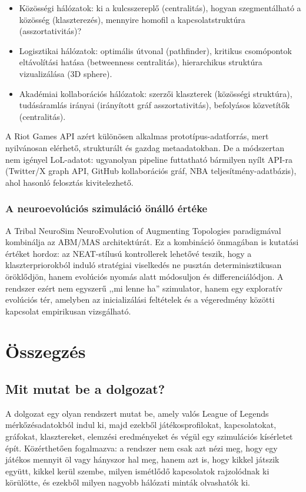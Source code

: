 ﻿\documentclass[a4paper,12pt]{report}
\begin{document}
\begin{itemize}
  \item Közösségi hálózatok: ki a kulcsszereplő (centralitás), hogyan szegmentálható
    a közösség (klaszterezés), mennyire homofil a kapcsolatstruktúra (asszortativitás)?
  \item Logisztikai hálózatok: optimális útvonal (pathfinder), kritikus csomópontok
    eltávolítási hatása (betweenness centralitás), hierarchikus struktúra vizualizálása
    (3D sphere).
  \item Akadémiai kollaborációs hálózatok: szerzői klaszterek (közösségi struktúra),
    tudásáramlás irányai (irányított gráf asszortativitás), befolyásos közvetítők
    (centralitás).
\end{itemize}

A Riot Games API azért különösen alkalmas prototípus-adatforrás, mert nyilvánosan
elérhető, strukturált és gazdag metaadatokban. De a módszertan nem igényel LoL-adatot:
ugyanolyan pipeline futtatható bármilyen nyílt API-ra (Twitter/X graph API, GitHub
kollaborációs gráf, NBA teljesítmény-adatbázis), ahol hasonló felosztás kivitelezhető.

\subsection*{A neuroevolúciós szimuláció önálló értéke}

A Tribal NeuroSim NeuroEvolution of Augmenting Topologies paradigmával kombinálja az
ABM/MAS architektúrát. Ez a kombináció önmagában is kutatási értéket hordoz:
az NEAT-stílusú kontrollerek lehetővé teszik, hogy a klaszterpriorokból induló
stratégiai viselkedés ne pusztán determinisztikusan öröklődjön, hanem evolúciós
nyomás alatt módosuljon és differenciálódjon. A rendszer ezért nem egyszerű
,,mi lenne ha'' szimulator, hanem egy exploratív evolúciós tér, amelyben az
inicializálási feltételek és a végeredmény közötti kapcsolat empirikusan vizsgálható.

\chapter{Összegzés}

\section{Mit mutat be a dolgozat?}

A dolgozat egy olyan rendszert mutat be, amely valós League of Legends mérkőzésadatokból indul ki,
majd ezekből játékosprofilokat, kapcsolatokat, gráfokat, klasztereket, elemzési eredményeket és
végül egy szimulációs kísérletet épít. Közérthetően fogalmazva: a rendszer nem csak azt nézi meg,
hogy egy játékos mennyit öl vagy hányszor hal meg, hanem azt is, hogy kikkel játszik együtt,
kikkel kerül szembe, milyen ismétlődő kapcsolatok rajzolódnak ki körülötte, és ezekből milyen
nagyobb hálózati minták olvashatók ki.
\end{document}
